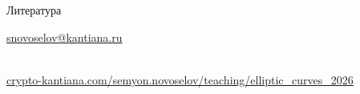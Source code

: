 \documentclass{beamer}
\begin{document}
\begin{frame}{Литература}
    \nocite{CohenFrey+2005}
    \nocite{Washington2008}
    \printbibliography
    
    \begin{center}
        \begin{tcolorbox}[enhanced,hbox,colback=block-green-color-bg,colframe=subsection-color!120,title=Контакты,center title]
            \begin{varwidth}{\textwidth}
                \begin{center}
                    \href{mailto:snovoselov@kantiana.ru}{snovoselov@kantiana.ru}
                \end{center}
            \end{varwidth}
        \end{tcolorbox}	
    \end{center}

\\
{\footnotesize
    \href{https://crypto-kantiana.com/semyon.novoselov/teaching/elliptic_curves_2026}{crypto-kantiana.com/semyon.novoselov/teaching/elliptic\_curves\_2026}
}
\end{frame}
\end{document}
